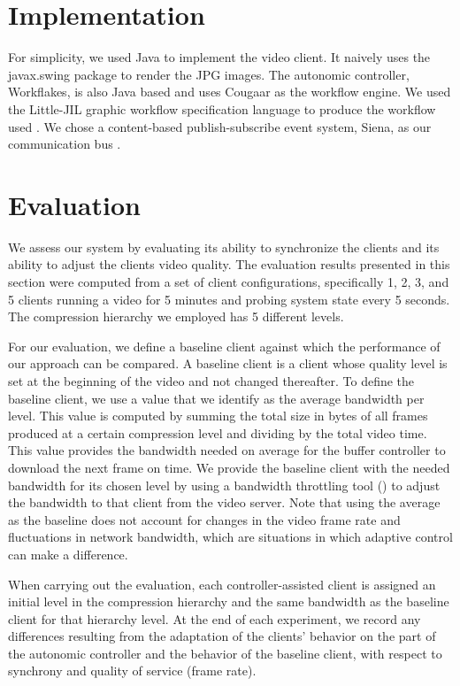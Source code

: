 \documentclass{sig-alternate}
\begin{document}
\section{Implementation} \label{implementation}

For simplicity, we used Java to implement the video client.  It
naively uses the javax.swing package to render the JPG images.  The
autonomic controller, Workflakes, is also Java based and uses Cougaar
\cite{Cougaar} as the workflow engine.  We used the Little-JIL graphic
workflow specification language to produce the workflow used
\cite{L-JIL}.  We chose a content-based publish-subscribe event
system, Siena, as our communication bus \cite{SIENA}.

\section{Evaluation} \label{eval}

We assess our system by evaluating its ability to synchronize the
clients and its ability to adjust the clients video quality.  The
evaluation results presented in this section were computed from a set
of client configurations, specifically 1, 2, 3, and 5 clients running
a video for 5 minutes and probing system state every 5 seconds. The
compression hierarchy we employed has 5 different levels.

For our evaluation, we define a baseline client against which the
performance of our approach can be compared.  A baseline client is a
client whose quality level is set at the beginning of the video and
not changed thereafter.  To define the baseline client, we use a value
that we identify as the average bandwidth per level. This value is
computed by summing the total size in bytes of all frames produced at
a certain compression level and dividing by the total video time.
This value provides the bandwidth needed on average for the buffer
controller to download the next frame on time.  We provide the
baseline client with the needed bandwidth for its chosen level by
using a bandwidth throttling tool (\cite{SHAPERD}) to adjust the
bandwidth to that client from the video server.  Note that using the
average as the baseline does not account for changes in the video
frame rate and fluctuations in network bandwidth, which are situations
in which adaptive control can make a difference.

When carrying out the evaluation, each controller-assisted client is
assigned an initial level in the compression hierarchy and the same
bandwidth as the baseline client for that hierarchy level.  At the end
of each experiment, we record any differences resulting from the
adaptation of the clients' behavior on the part of the autonomic
controller and the behavior of the baseline client, with respect to
synchrony and quality of service (frame rate).
\end{document}
